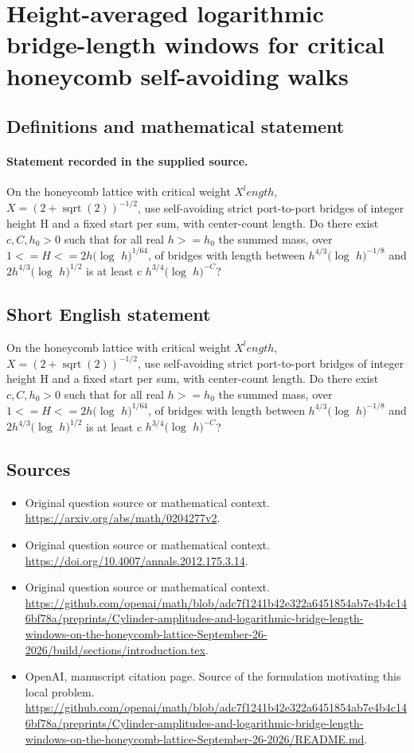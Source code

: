 \documentclass[11pt]{article}
\begin{document}
\section*{Height-averaged logarithmic bridge-length windows for critical honeycomb self-avoiding walks}\label{30007421}
\subsection{Definitions and mathematical statement}
\paragraph{Statement recorded in the supplied source.}
On the honeycomb lattice with critical weight $X^length$, $X=(2+\operatorname{sqrt}(2))^{-1/2}$, use self-avoiding strict port-to-port bridges of integer height H and a fixed start per sum, with center-count length. Do there exist $c,C,h_0>0$ such that for all real $h>=h_0$ the summed mass, over $1<=H<=2h(\log $ $h)^{1/64}$, of bridges with length between $h^{4/3}(\log $ $h)^{-1/8}$ and $2h^{4/3}(\log $ $h)^{1/2}$ is at least c $h^{3/4}(\log $ $h)^{-C}$?
\subsection{Short English statement}
On the honeycomb lattice with critical weight $X^length$, $X=(2+\operatorname{sqrt}(2))^{-1/2}$, use self-avoiding strict port-to-port bridges of integer height H and a fixed start per sum, with center-count length. Do there exist $c,C,h_0>0$ such that for all real $h>=h_0$ the summed mass, over $1<=H<=2h(\log $ $h)^{1/64}$, of bridges with length between $h^{4/3}(\log $ $h)^{-1/8}$ and $2h^{4/3}(\log $ $h)^{1/2}$ is at least c $h^{3/4}(\log $ $h)^{-C}$?
\subsection{Sources}
\begin{itemize}
\item[S1] Original question source or mathematical context.
\url{https://arxiv.org/abs/math/0204277v2}.
\item[S2] Original question source or mathematical context.
\url{https://doi.org/10.4007/annals.2012.175.3.14}.
\item[S3] Original question source or mathematical context.
\url{https://github.com/openai/math/blob/adc7f1241b42e322a6451854ab7e4b4c146bf78a/preprints/Cylinder-amplitudes-and-logarithmic-bridge-length-windows-on-the-honeycomb-lattice-September-26-2026/build/sections/introduction.tex}.
\item[S4] OpenAI, manuscript citation page. Source of the formulation motivating this local problem.
\url{https://github.com/openai/math/blob/adc7f1241b42e322a6451854ab7e4b4c146bf78a/preprints/Cylinder-amplitudes-and-logarithmic-bridge-length-windows-on-the-honeycomb-lattice-September-26-2026/README.md}.
\end{itemize}
\end{document}
